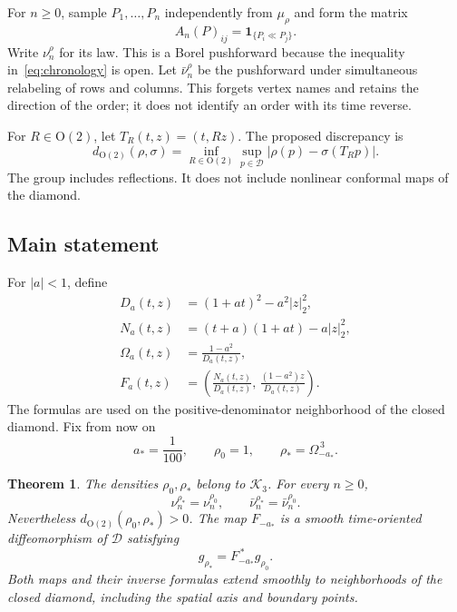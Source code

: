 \documentclass[11pt]{article}
\newtheorem{theorem}{Theorem}[section]
\theoremstyle{remark}
\newcommand{\D}{\mathcal D}
\newcommand{\K}{\mathcal K_3}
\newcommand{\Otwo}{\mathrm O(2)}
\begin{document}
For $n\geq0$, sample $P_1,\ldots,P_n$ independently from $\mu_\rho$ and
form the matrix
\[
 A_n(P)_{ij}=\mathbf 1_{\{P_i\ll P_j\}}.
\]
Write $\nu_n^\rho$ for its law. This is a Borel pushforward because the
inequality in~\eqref{eq:chronology} is open. Let $\bar\nu_n^\rho$ be the
pushforward under simultaneous relabeling of rows and columns. This
forgets vertex names and retains the direction of the order; it does
not identify an order with its time reverse.

For $R\in\Otwo$, let $T_R(t,z)=(t,Rz)$. The proposed discrepancy is
\begin{equation}\label{eq:distance}
 d_{\Otwo}(\rho,\sigma)=
 \inf_{R\in\Otwo}\sup_{p\in\D}|\rho(p)-\sigma(T_Rp)|.
\end{equation}
The group includes reflections. It does not include nonlinear conformal
maps of the diamond.

\subsection{Main statement}
For $|a|<1$, define
\begin{align}
 D_a(t,z)&=(1+at)^2-a^2|z|_2^2,\label{eq:denominator}\\
 N_a(t,z)&=(t+a)(1+at)-a|z|_2^2,\nonumber\\
 \Omega_a(t,z)&=\frac{1-a^2}{D_a(t,z)},\nonumber\\
 F_a(t,z)&=\left(\frac{N_a(t,z)}{D_a(t,z)},\,
                  \frac{(1-a^2)z}{D_a(t,z)}\right).\label{eq:flow}
\end{align}
The formulas are used on the positive-denominator neighborhood of the
closed diamond. Fix from now on
\begin{equation}\label{eq:density}
 a_*=\frac1{100},\qquad \rho_0=1,\qquad
 \rho_* =\Omega_{-a_*}^{\,3}.
\end{equation}

\begin{theorem}\label{thm:main}
The densities $\rho_0,\rho_*$ belong to $\K$. For every $n\geq0$,
\[
 \nu_n^{\rho_*}=\nu_n^{\rho_0},\qquad
 \bar\nu_n^{\rho_*}=\bar\nu_n^{\rho_0}.
\]
Nevertheless $d_{\Otwo}(\rho_0,\rho_*)>0$. The map $F_{-a_*}$ is a
smooth time-oriented diffeomorphism of $\D$ satisfying
\begin{equation}\label{eq:isometry}
 g_{\rho_*}=F_{-a_*}^{\,*}g_{\rho_0}.
\end{equation}
Both maps and their inverse formulas extend smoothly to neighborhoods
of the closed diamond, including the spatial axis and boundary points.
\end{theorem}
\end{document}

